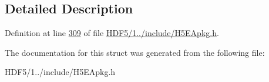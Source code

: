 \subsection{Detailed Description}


Definition at line \hyperlink{_h_d_f5_21_810_81_2include_2_h5_e_apkg_8h_source_l00309}{309} of file \hyperlink{_h_d_f5_21_810_81_2include_2_h5_e_apkg_8h_source}{H\+D\+F5/1../include/\+H5\+E\+Apkg.\+h}.



The documentation for this struct was generated from the following file\+:\begin{DoxyCompactItemize}
\item 
H\+D\+F5/1../include/\+H5\+E\+Apkg.\+h\end{DoxyCompactItemize}
